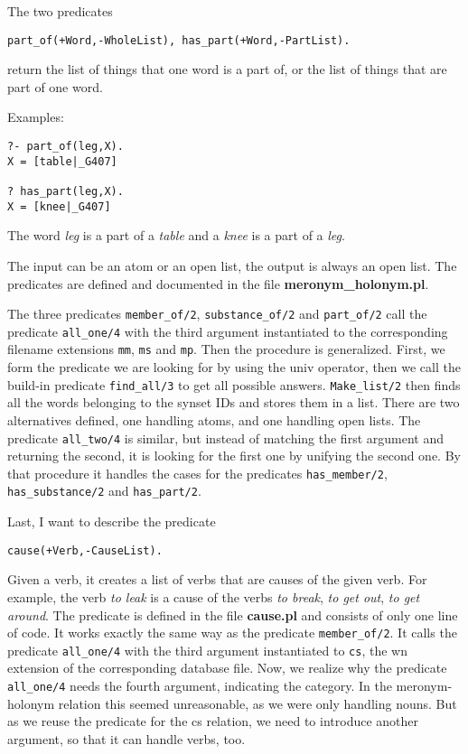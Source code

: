 \documentclass[12pt]{article}
\begin{document}
The two predicates
\begin{verbatim}
part_of(+Word,-WholeList), has_part(+Word,-PartList).
\end{verbatim}
return the list of things that one word is a
part of, or the list of things that are part of one word.

Examples:
\begin{verbatim}
?- part_of(leg,X).
X = [table|_G407]

? has_part(leg,X).
X = [knee|_G407]
\end{verbatim}

The word \emph{leg} is a part of a \emph{table} and a \emph{knee} is a part of a \emph{leg}.

The input can be an atom or an open list, the output is always an open list. The predicates are
defined and documented in the file {\bfseries meronym\_holonym.pl}.

The three predicates {\tt member\_of/2}, {\tt substance\_of/2} and {\tt part\_of/2}
call the predicate {\tt all\_one/4} with the third argument instantiated to the corresponding filename extensions {\tt mm}, {\tt ms}
and {\tt mp}. Then the procedure is generalized. First, we form the predicate we are looking for by using the univ operator, then we
call the build-in predicate {\tt find\_all/3} to get all possible answers. {\tt Make\_list/2} then finds all the words belonging
to the synset IDs and stores them in a list.
There are two alternatives defined, one handling atoms, and one handling open lists. The predicate {\tt all\_two/4} is similar,
but instead of matching the first argument and returning the second, it is looking for the first one by unifying the second one.
By that procedure it handles the cases for the predicates {\tt has\_member/2}, {\tt has\_substance/2} and {\tt has\_part/2}.

Last, I want to describe the predicate

\begin{verbatim}
cause(+Verb,-CauseList).
\end{verbatim}

Given a verb, it creates a list of verbs that are causes of the given verb. For example, the verb \emph{to leak} is
a cause of the verbs \emph{to break}, \emph{to get out}, \emph{to get around}. The predicate is defined in the file {\bfseries cause.pl}
and
consists of only one line of code. It works exactly the same way as the predicate {\tt member\_of/2}. It
calls the predicate {\tt all\_one/4} with the third argument instantiated to {\tt cs}, the wn extension of the corresponding
database file. Now, we realize why the predicate {\tt all\_one/4} needs the fourth argument, indicating the category. In the
meronym-holonym relation this seemed unreasonable, as we were only handling nouns. But as we reuse the predicate
for the cs relation, we need to introduce another argument, so that it can handle verbs, too.
\end{document}

